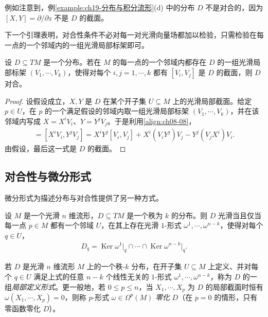 \documentclass[../../main.tex]{subfiles}
\begin{document}
例如注意到，例\cref{example:ch19-分布与积分流形}(d) 中的分布 $D$ 不是对合的，因为 $[X,Y]=\partial/\partial z$ 不是 $D$ 的截面。

下一个引理表明，对合性条件不必对每一对光滑向量场都加以检验，只需检验在每一点的一个邻域内的一组光滑局部标架即可。

\begin{lemma}[对合性的局部标架判别法]\label{lemma:ch19-局部标架对合判别}
设 $D\subseteq TM$ 是一个分布。若在 $M$ 的每一点的一个邻域内都存在 $D$ 的一组光滑局部标架 $(V_1,\cdots ,V_k)$，使得对每个 $i,j=1,\cdots ,k$ 都有 $[V_i,V_j]$ 是 $D$ 的截面，则 $D$ 对合。
\end{lemma}

\begin{proof}
设假设成立，$X,Y$ 是 $D$ 在某个开子集 $U\subseteq M$ 上的光滑局部截面。给定 $p\in U$，在 $p$ 的一个满足假设的邻域内取一组光滑局部标架 $(V_1,\cdots ,V_k)$，并在该邻域内写成 $X=X^iV_i$、$Y=Y^jV_j$。于是利用\eqref{align:ch08-08}，
\begin{align*}
[X,Y]=[X^iV_i,Y^jV_j]=X^iY^j[V_i,V_j]+X^i(V_iY^j)V_j-Y^j(V_jX^i)V_i.
\end{align*}
由假设，最后这一式是 $D$ 的截面。
\end{proof}

\subsection{对合性与微分形式}

微分形式为描述分布与对合性提供了另一种方式。

\begin{lemma}\label{lemma:ch19-1形式判别}
设 $M$ 是一个光滑 $n$ 维流形，$D\subseteq TM$ 是一个秩为 $k$ 的分布。则 $D$ 光滑当且仅当每一点 $p\in M$ 都有一个邻域 $U$，在其上存在光滑 $1$-形式 $\omega^1,\cdots ,\omega^{n-k}$，使得对每个 $q\in U$，
\begin{align}
D_q=\operatorname{Ker}\omega^1\big|_q\cap\cdots\cap\operatorname{Ker}\omega^{n-k}\big|_q.
\end{align}
\end{lemma}

若 $D$ 是光滑 $n$ 维流形 $M$ 上的一个秩-$k$ 分布，在开子集 $U\subseteq M$ 上定义、并对每个 $q\in U$ 满足上式的任意 $n-k$ 个线性无关的 $1$-形式 $\omega^1,\cdots ,\omega^{n-k}$，称为 $D$ 的一组\emph{局部定义形式}。更一般地，若 $0\leqslant p\leqslant n$，当 $X_1,\cdots ,X_p$ 为 $D$ 的局部截面时恒有 $\omega(X_1,\cdots ,X_p)=0$，则称 $p$-形式 $\omega\in\Omega^p(M)$ \emph{零化} $D$（在 $p=0$ 的情形，只有零函数零化 $D$）。
\end{document}
